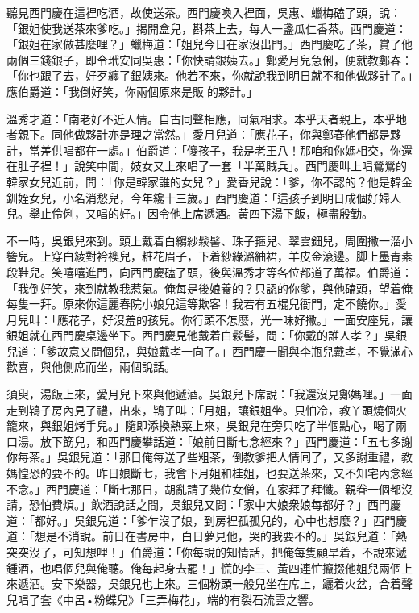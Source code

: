 聽見西門慶在這裡吃酒，故使送茶。西門慶喚入裡面，吳惠、蠟梅磕了頭，說：「銀姐使我送茶來爹吃。」揭開盒兒，斟茶上去，每人一盞瓜仁香茶。西門慶道：「銀姐在家做甚麼哩？」蠟梅道：「姐兒今日在家沒出門。」西門慶吃了茶，賞了他兩個三錢銀子，即令玳安同吳惠：「你快請銀姨去。」鄭愛月兒急俐，便就教鄭春：「你也跟了去，好歹纏了銀姨來。他若不來，你就說我到明日就不和他做夥計了。」應伯爵道：「我倒好笑，你兩個原來是販𣬼的夥計。」

{}溫秀才道：「南老好不近人情。自古同聲相應，同氣相求。{}本乎天者親上，本乎地者親下。{}同他做夥計亦是理之當然。」愛月兒道：「應花子，你與鄭春他們都是夥計，當差供唱都在一處。」伯爵道：「傻孩子，我是老王八！那咱和你媽相交，你還在肚子裡！」說笑中間，妓女又上來唱了一套「半萬賊兵」。西門慶叫上唱鶯鶯的韓家女兒近前，問：「你是韓家誰的女兒？」愛香兒說：「爹，你不認的？他是韓金釧姪女兒，小名消愁兒，今年纔十三歲。」西門慶道：「這孩子到明日成個好婦人兒。舉止伶俐，又唱的好。」因令他上席遞酒。黃四下湯下飯，極盡殷勤。

不一時，吳銀兒來到。頭上戴着白縐紗鬏髻、珠子箍兒、翠雲鈿兒，周圍撇一溜小簪兒。上穿白綾對衿襖兒，粧花眉子，下着紗綠潞紬裙，羊皮金滾邊。脚上墨青素段鞋兒。{}笑嘻嘻進門，向西門慶磕了頭，後與溫秀才等各位都道了萬福。伯爵道：「我倒好笑，來到就教我惹氣。俺每是後娘養的？只認的你爹，與他磕頭，望着俺每隻一拜。原來你這麗春院小娘兒這等欺客！我若有五棍兒衙門，定不饒你。」{}愛月兒叫：「應花子，好沒羞的孩兒。你行頭不怎麼，光一味好撇。」一面安座兒，讓銀姐就在西門慶桌邊坐下。西門慶見他戴着白鬏髻，問：「你戴的誰人孝？」吳銀兒道：「爹故意又問個兒，與娘戴孝一向了。」西門慶一聞與李瓶兒戴孝，不覺滿心歡喜，與他側席而坐，兩個說話。

須臾，湯飯上來，愛月兒下來與他遞酒。吳銀兒下席說：「我還沒見鄭媽哩。」一面走到鴇子房內見了禮，出來，鴇子叫：「月姐，讓銀姐坐。只怕冷，教丫頭燒個火籠來，與銀姐烤手兒。」隨即添換熱菜上來，吳銀兒在旁只吃了半個點心，喝了兩口湯。放下筯兒，和西門慶攀話道：「娘前日斷七念經來？」西門慶道：「五七多謝你每茶。」吳銀兒道：「那日俺每送了些粗茶，倒教爹把人情囘了，又多謝重禮，教媽惶恐的要不的。昨日娘斷七，我會下月姐和桂姐，也要送茶來，又不知宅內念經不念。」西門慶道：「斷七那日，胡亂請了幾位女僧，在家拜了拜懺。親眷一個都沒請，恐怕費煩。」飲酒說話之間，吳銀兒又問：「家中大娘衆娘每都好？」西門慶道：「都好。」吳銀兒道：「爹乍沒了娘，到房裡孤孤兒的，心中也想麼？{}」西門慶道：「想是不消說。前日在書房中，白日夢見他，哭的我要不的。」吳銀兒道：「熱突突沒了，可知想哩！」伯爵道：「你每說的知情話，把俺每隻顧旱着，不說來遞鍾酒，也唱個兒與俺聽。俺每起身去罷！」慌的李三、黃四連忙攛掇他姐兒兩個上來遞酒。安下樂器，吳銀兒也上來。三個粉頭一般兒坐在席上，躧着火盆，合着聲兒唱了套《中呂•粉蝶兒》「三弄梅花」，端的有裂石流雲之響。


